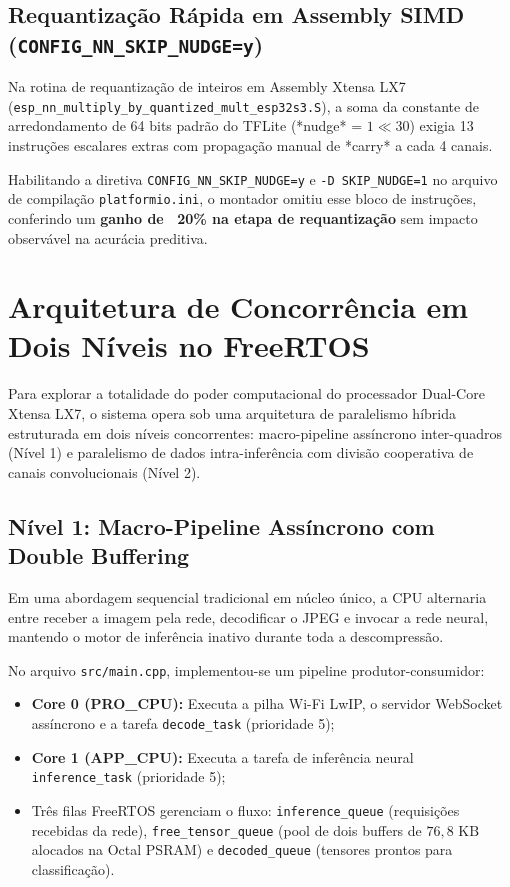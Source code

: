 \subsection{Requantização Rápida em Assembly SIMD (\texttt{CONFIG\_NN\_SKIP\_NUDGE=y})}

Na rotina de requantização de inteiros em Assembly Xtensa LX7 (\texttt{esp\_nn\_multiply\_by\_quantized\_mult\_esp32s3.S}), a soma da constante de arredondamento de 64 bits padrão do TFLite (*nudge* = $1 \ll 30$) exigia 13 instruções escalares extras com propagação manual de *carry* a cada 4 canais.

Habilitando a diretiva \texttt{CONFIG\_NN\_SKIP\_NUDGE=y} e \texttt{-D SKIP\_NUDGE=1} no arquivo de compilação \texttt{platformio.ini}, o montador omitiu esse bloco de instruções, conferindo um \textbf{ganho de ~20\% na etapa de requantização} sem impacto observável na acurácia preditiva.

\section{Arquitetura de Concorrência em Dois Níveis no FreeRTOS}

Para explorar a totalidade do poder computacional do processador Dual-Core Xtensa LX7, o sistema opera sob uma arquitetura de paralelismo híbrida estruturada em dois níveis concorrentes: macro-pipeline assíncrono inter-quadros (Nível 1) e paralelismo de dados intra-inferência com divisão cooperativa de canais convolucionais (Nível 2).

\subsection{Nível 1: Macro-Pipeline Assíncrono com Double Buffering}

Em uma abordagem sequencial tradicional em núcleo único, a CPU alternaria entre receber a imagem pela rede, decodificar o JPEG e invocar a rede neural, mantendo o motor de inferência inativo durante toda a descompressão.

No arquivo \texttt{src/main.cpp}, implementou-se um pipeline produtor-consumidor:
\begin{itemize}
    \item \textbf{Core 0 (PRO\_CPU):} Executa a pilha Wi-Fi LwIP, o servidor WebSocket assíncrono e a tarefa \texttt{decode\_task} (prioridade 5);
    \item \textbf{Core 1 (APP\_CPU):} Executa a tarefa de inferência neural \texttt{inference\_task} (prioridade 5);
    \item Três filas FreeRTOS gerenciam o fluxo: \texttt{inference\_queue} (requisições recebidas da rede), \texttt{free\_tensor\_queue} (pool de dois buffers de $76,8\text{ KB}$ alocados na Octal PSRAM) e \texttt{decoded\_queue} (tensores prontos para classificação).
\end{itemize}

